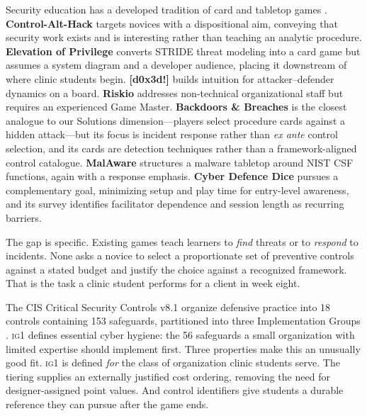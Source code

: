 \documentclass[10pt,twocolumn,letterpaper]{article}
\newcommand{\ig}[1]{\textsc{ig#1}}
\begin{document}
Security education has a developed tradition of card and tabletop games
\cite{shostack_games}. \textbf{Control-Alt-Hack}
\cite{denning2013controlalthack} targets novices with a dispositional aim,
conveying that security work exists and is interesting rather than teaching an
analytic procedure. \textbf{Elevation of Privilege} \cite{shostack2014eop}
converts STRIDE threat modeling into a card game but assumes a system diagram
and a developer audience, placing it downstream of where clinic students begin.
\textbf{[d0x3d!]} \cite{gondree2013d0x3d} builds intuition for
attacker--defender dynamics on a board. \textbf{Riskio} \cite{hart2020riskio}
addresses non-technical organizational staff but requires an experienced Game
Master. \textbf{Backdoors \& Breaches} \cite{young2021backdoors,bhis2019backdoors} is the closest
analogue to our Solutions dimension---players select procedure cards against a
hidden attack---but its focus is incident response rather than \emph{ex ante}
control selection, and its cards are detection techniques rather than a
framework-aligned control catalogue. \textbf{MalAware} \cite{malaware2024}
structures a malware tabletop around NIST CSF functions, again with a response
emphasis. \textbf{Cyber Defence Dice} \cite{cyberdefencedice2026} pursues a
complementary goal, minimizing setup and play time for entry-level awareness,
and its survey identifies facilitator dependence and session length as recurring
barriers.

The gap is specific. Existing games teach learners to \emph{find} threats or to
\emph{respond} to incidents. None asks a novice to select a proportionate set of
preventive controls against a stated budget and justify the choice against a
recognized framework. That is the task a clinic student performs for a client in
week eight.

The CIS Critical Security Controls v8.1 organize defensive practice into 18
controls containing 153 safeguards, partitioned into three Implementation
Groups \cite{cis2024controls,cis_ig}. \ig{1} defines essential cyber hygiene:
the 56 safeguards a small organization with limited expertise should implement
first. Three properties make this an unusually good fit. \ig{1} is defined
\emph{for} the class of organization clinic students serve. The tiering supplies
an externally justified cost ordering, removing the need for designer-assigned
point values. And control identifiers give students a durable reference they can
pursue after the game ends.

\end{document}
